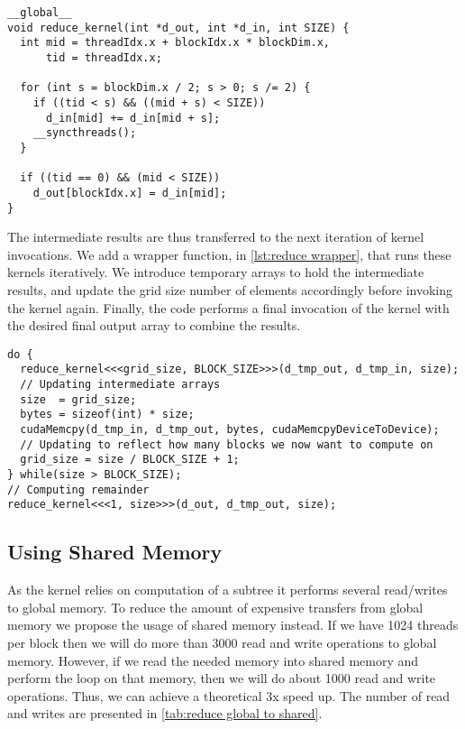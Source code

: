 \begin{lstlisting}[caption={Reduce kernel}, label={lst:reduce par}]
__global__
void reduce_kernel(int *d_out, int *d_in, int SIZE) {
  int mid = threadIdx.x + blockIdx.x * blockDim.x,
      tid = threadIdx.x;

  for (int s = blockDim.x / 2; s > 0; s /= 2) {
    if ((tid < s) && ((mid + s) < SIZE))
      d_in[mid] += d_in[mid + s];
    __syncthreads();
  }

  if ((tid == 0) && (mid < SIZE))
    d_out[blockIdx.x] = d_in[mid];
}
\end{lstlisting}

The intermediate results are thus transferred to the next iteration of kernel invocations.
We add a wrapper function, in \cref{lst:reduce wrapper}, that runs these kernels iteratively.
We introduce temporary arrays to hold the intermediate results, and update the grid size number of elements accordingly before invoking the kernel again.
Finally, the code performs a final invocation of the kernel with the desired final output array to combine the results.

\begin{lstlisting}[caption={The loop in the wrapper for the reduce kernel}, label={lst:reduce wrapper}]
do {
  reduce_kernel<<<grid_size, BLOCK_SIZE>>>(d_tmp_out, d_tmp_in, size);
  // Updating intermediate arrays
  size  = grid_size;
  bytes = sizeof(int) * size;
  cudaMemcpy(d_tmp_in, d_tmp_out, bytes, cudaMemcpyDeviceToDevice);
  // Updating to reflect how many blocks we now want to compute on
  grid_size = size / BLOCK_SIZE + 1;
} while(size > BLOCK_SIZE);
// Computing remainder
reduce_kernel<<<1, size>>>(d_out, d_tmp_out, size);
\end{lstlisting}

\subsection{Using Shared Memory}
\label{sec: reduce shared memory}

As the kernel relies on computation of a subtree it performs several read/writes to global memory.
To reduce the amount of expensive transfers from global memory we propose the usage of shared memory instead.
If we have 1024 threads per block then we will do more than 3000 read and write operations to global memory.
However, if we read the needed memory into shared memory and perform the loop on that memory, then we will do about 1000 read and write operations.
Thus, we can achieve a theoretical 3x speed up.
The number of read and writes are presented in \cref{tab:reduce global to shared}.

